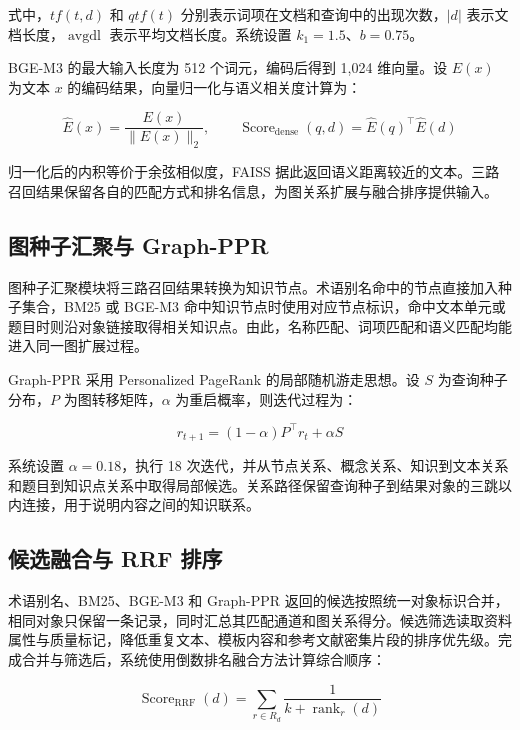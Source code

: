 式中，\(tf(t,d)\) 和 \(qtf(t)\) 分别表示词项在文档和查询中的出现次数，\(|d|\) 表示文档长度，\(\operatorname{avgdl}\) 表示平均文档长度。系统设置 \(k_1=1.5\)、\(b=0.75\)。

BGE-M3 的最大输入长度为 512 个词元，编码后得到 1,024 维向量。设 \(E(x)\) 为文本 \(x\) 的编码结果，向量归一化与语义相关度计算为：

\begin{equation}
  \label{eq:dense-score}
  \hat{E}(x)=\frac{E(x)}{\lVert E(x)\rVert_2},
  \qquad
  \operatorname{Score}_{\mathrm{dense}}(q,d)=\hat{E}(q)^{\top}\hat{E}(d)
\end{equation}

归一化后的内积等价于余弦相似度，FAISS 据此返回语义距离较近的文本。三路召回结果保留各自的匹配方式和排名信息，为图关系扩展与融合排序提供输入。

\subsection{图种子汇聚与 Graph-PPR}

图种子汇聚模块将三路召回结果转换为知识节点。术语别名命中的节点直接加入种子集合，BM25 或 BGE-M3 命中知识节点时使用对应节点标识，命中文本单元或题目时则沿对象链接取得相关知识点。由此，名称匹配、词项匹配和语义匹配均能进入同一图扩展过程。

Graph-PPR 采用 Personalized PageRank 的局部随机游走思想\cite{page1999pagerank}。设 \(S\) 为查询种子分布，\(P\) 为图转移矩阵，\(\alpha\) 为重启概率，则迭代过程为：

\begin{equation}
  \label{eq:graph-ppr}
  r_{t+1}=(1-\alpha)P^{\top}r_t+\alpha S
\end{equation}

系统设置 \(\alpha=0.18\)，执行 18 次迭代，并从节点关系、概念关系、知识到文本关系和题目到知识点关系中取得局部候选。关系路径保留查询种子到结果对象的三跳以内连接，用于说明内容之间的知识联系。

\subsection{候选融合与 RRF 排序}

术语别名、BM25、BGE-M3 和 Graph-PPR 返回的候选按照统一对象标识合并，相同对象只保留一条记录，同时汇总其匹配通道和图关系得分。候选筛选读取资料属性与质量标记，降低重复文本、模板内容和参考文献密集片段的排序优先级。完成合并与筛选后，系统使用倒数排名融合方法计算综合顺序\cite{cormack2009rrf}：

\begin{equation}
  \label{eq:rrf}
  \operatorname{Score}_{\mathrm{RRF}}(d)=\sum_{r\in R_d}\frac{1}{k+\operatorname{rank}_r(d)}
\end{equation}

